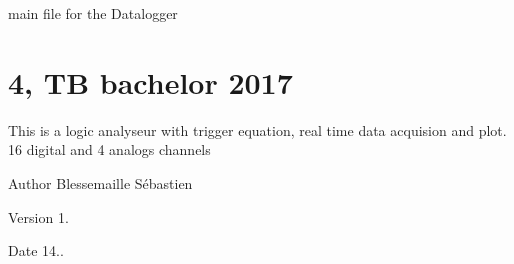 main file for the Datalogger \hypertarget{index_ISEC}{}\section{4, T\+B bachelor 2017}\label{index_ISEC}
This is a logic analyseur with trigger equation, real time data acquision and plot. 16 digital and 4 analogs channels

\begin{DoxyAuthor}{Author}
Blessemaille Sébastien 
\end{DoxyAuthor}
\begin{DoxyVersion}{Version}
1. 
\end{DoxyVersion}
\begin{DoxyDate}{Date}
14.. 
\end{DoxyDate}
